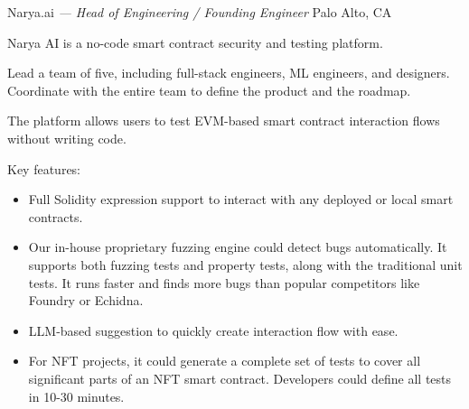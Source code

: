 \documentclass[]{friggeri-cv} %
\begin{document}
\begin{entrylist}
  {Narya.ai \emph{--- Head of Engineering / Founding Engineer}}
  {Palo Alto, CA}
  {
    Narya AI is a no-code smart contract security and testing platform.

    Lead a team of five, including full-stack engineers, ML engineers, and designers.
    Coordinate with the entire team to define the product and the roadmap.

    The platform allows users to test EVM-based smart contract interaction flows without writing code.

    Key features:
    \begin{itemize}
      \item Full Solidity expression support to interact with any deployed or local smart contracts.
      \item Our in-house proprietary fuzzing engine could detect bugs automatically.
      It supports both fuzzing tests and property tests, along with the traditional unit tests.
      It runs faster and finds more bugs than popular competitors like Foundry or Echidna.
      \item LLM-based suggestion to quickly create interaction flow with ease.
      \item For NFT projects, it could generate a complete set of tests to cover all significant parts of an NFT smart contract.
      Developers could define all tests in 10-30 minutes.
    \end{itemize}

}
\end{entrylist}
\end{document}
